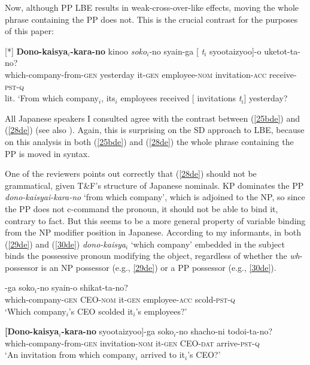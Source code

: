 \documentclass[output=paper]{langscibook}
\begin{document}
Now, although PP LBE results in weak-cross-over-like effects, moving the whole phrase containing the PP does not. This is the crucial contrast for the purposes of this paper:

\begin{exe}
[*]{ 
\gll \textbf{Dono-kaisya}$_{i}$\textbf{-kara-no}  kinoo  \textit{soko}$_{i}$-no syain-ga [ \textit{t}$_{i}$    syootaizyoo]-o uketot-ta-no?\\
which-company-from-\textsc{gen} yesterday it-\textsc{gen} employee-\textsc{nom} {} {} invitation-\textsc{acc} receive-\textsc{pst}-\textsc{q}\\
\glt lit. ‘From which company$_{i}$, its$_{i}$ employees received [ invitations \textit{t}$_{i}$] yesterday?}
\end{exe}

All Japanese speakers I consulted agree with the contrast between (\ref{25bde}) and (\ref{28de}) (see also \citealt{AranoOda2019}). Again, this is surprising on the SD approach to LBE, because on this analysis in both (\ref{25bde}) and (\ref{28de}) the whole phrase containing the PP is moved in syntax.

One of the reviewers points out correctly that (\ref{28de}) should not be grammatical, given T\&F’s structure of Japanese nominals. KP dominates the PP \textit{dono-kaisyai-kara-no} ‘from which company’, which is adjoined to the NP, so since the PP does not c-command the pronoun, it should not be able to bind it, contrary to fact. But this seems to be a more general property of variable binding from the NP modifier position in Japanese. According to my informants, in both (\ref{29de}) and (\ref{30de}) \textit{dono-kaisya}$_{i}$ ‘which company’ embedded in the subject binds the possessive pronoun modifying the object, regardless of whether the \textit{wh}-possessor is an NP possessor (e.g., \ref{29de}) or a PP possessor (e.g., \ref{30de}).

\begin{exe}
\ex \label{29de}
-ga soko$_{i}$-no syain-o shikat-ta-no?\\
which-company-\textsc{gen} CEO-\textsc{nom} it-\textsc{gen} employee-\textsc{acc} scold-\textsc{pst}-\textsc{q}\\
\glt ‘Which company$_{i}$’s CEO scolded it$_{i}$’s employees?’ 

\ex \label{30de}
\gll \textbf{[Dono-kaisya$_{i}$-kara-no}       syootaizyoo]-ga soko$_{i}$-no shacho-ni todoi-ta-no?\\
which-company-from-\textsc{gen} invitation-\textsc{nom} it-\textsc{gen} CEO-\textsc{dat} arrive-\textsc{pst}-\textsc{q}\\
\glt ‘An invitation from which company$_{i}$ arrived to it$_{i}$’s CEO?’ 
\end{exe}
\end{document}
